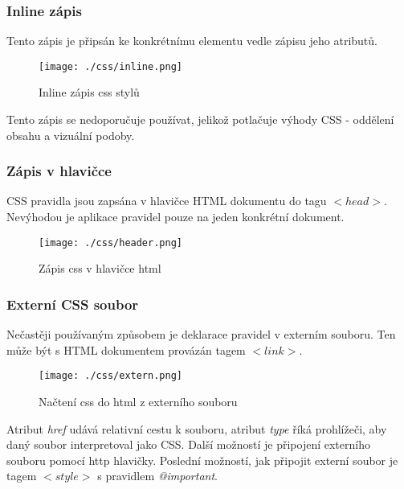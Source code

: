 \documentclass[main.tex]{subfiles}
\begin{document}
\subsubsection*{Inline zápis}
Tento zápis je připsán ke konkrétnímu elementu vedle zápisu jeho atributů.
		\begin{figure}[h]
			\centering
			\texttt{[image: ./css/inline.png]}
			\caption{Inline zápis css stylů}
		\end{figure}
Tento zápis se nedoporučuje používat, jelikož potlačuje výhody CSS - oddělení obsahu a vizuální podoby.

\subsubsection*{Zápis v hlavičce}
CSS pravidla jsou zapsána v hlavičce HTML dokumentu do tagu $<head>$. Nevýhodou je aplikace pravidel pouze na jeden konkrétní dokument.
		\begin{figure}[h]
			\centering
			\texttt{[image: ./css/header.png]}
			\caption{Zápis css v hlavičce html}
		\end{figure}
\subsubsection*{Externí CSS soubor}
Nečastěji používaným způsobem je deklarace pravidel v externím souboru. Ten může být s HTML dokumentem provázán tagem \textit{$<link>$}.
		\begin{figure}[h]
			\centering
			\texttt{[image: ./css/extern.png]}
			\caption{Načtení css do html z externího souboru }
		\end{figure}
Atribut \textit{href} udává relativní cestu k souboru, atribut \textit{type} říká prohlížeči, aby daný soubor interpretoval jako CSS. 
Další možností je připojení externího souboru pomocí http hlavičky.
Poslední možností, jak připojit externí soubor je tagem \textit{$<style>$} s pravidlem \textit{@important}.




\end{document}
